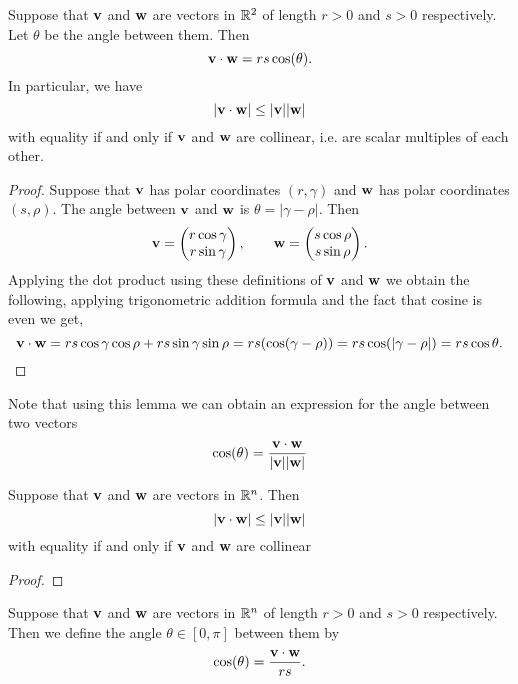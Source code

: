 \documentclass[10pt, a4paper]{article}
\begin{document}
\begin{lemma}
    Suppose that $\mathbf{v}$ and $\mathbf{w}$ are vectors in $\mathbb{R} ^ 2$ of length $r > 0 $ and $s > 0$ respectively. Let $\theta$ be the angle between them. Then
    \[
    \mathbf{v \cdot w} = rs\cos(\theta).
    \]
    In particular, we have
    \[
    |\mathbf{v \cdot w}| \leq |\mathbf{v}||\mathbf{w}|
    \]
    with equality if and only if $\mathbf{v}$ and $\mathbf{w}$ are collinear, i.e. are scalar multiples of each other.

    \begin{proof}
        Suppose that $\mathbf{v}$ has polar coordinates $(r, \gamma)$ and $\mathbf{w}$ has polar coordinates $(s, \rho)$. The angle between $\mathbf{v}$ and $\mathbf{w}$ is $\theta = |\gamma - \rho|$. Then
        \[
        \mathbf{v} = \begin{pmatrix}
            r\cos\gamma \\
            r\sin\gamma
        \end{pmatrix},
        \qquad
        \mathbf{w} = \begin{pmatrix}
            s\cos\rho \\
            s\sin\rho
        \end{pmatrix}.
        \]
        Applying the dot product using these definitions of $\mathbf{v}$ and $\mathbf{w}$ we obtain the following, applying trigonometric addition formula and the fact that cosine is even we get,
        \[
        \mathbf{v \cdot w} =  rs\cos\gamma\cos\rho + rs\sin\gamma\sin\rho = rs(\cos(\gamma - \rho)) = rs\cos(|\gamma - \rho|) = rs\cos\theta.
        \]
    \end{proof}
\end{lemma}
Note that using this lemma we can obtain an expression for the angle between two vectors
\[
\cos(\theta) = \frac{\mathbf{v \cdot w}}{|\mathbf{v}||\mathbf{w}|}
\]

\begin{theorem}
    Suppose that $\mathbf{v}$ and $\mathbf{w}$ are vectors in $\mathbb{R} ^ n$. Then
    \[
    |\mathbf{v \cdot w}| \leq |\mathbf{v}||\mathbf{w}|
    \]
    with equality if and only if $\mathbf{v}$ and $\mathbf{w}$ are collinear

    \begin{proof}
        
    \end{proof}
\end{theorem}

\begin{definition}\label{def:linalg:vec:angbetvecs}
    Suppose that $\mathbf{v}$ and $\mathbf{w}$ are vectors in $\mathbb{R} ^ n$ of length $r > 0$ and $s > 0$ respectively. Then we define the angle $\theta \in [0, \pi]$ between them by
    \[
    \cos(\theta) = \frac{\mathbf{v \cdot w}}{rs}.
    \]
\end{definition}
\end{document}
